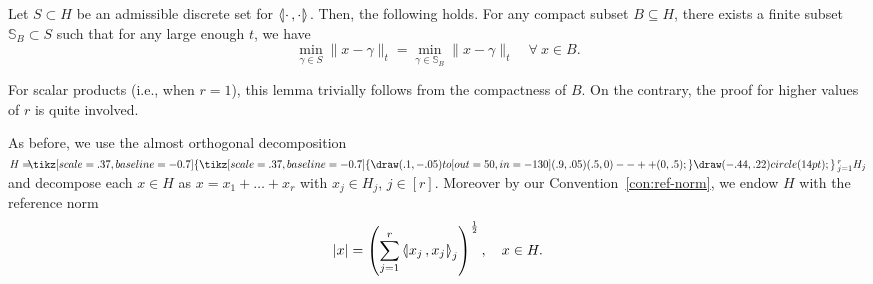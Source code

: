 \documentclass[AHL,Unicode,longabstracts]{cedram}
\newcommand{\symbuptm}{\tikz[scale=.37, baseline=-0.7]{\draw(.1,-.05)to[out=50,in=-130](.9,.05) (.5,0)--++(0,.5);}}
\newcommand{\almorth}{\tikz[scale=.37, baseline=-0.7]{\symbuptm \draw (-.44,.22) circle (14pt);}}
\newcommand{\aplus}{\hspace{-.2cm}\almorth\,}
\newcommand{\llangle}{\mathopen{\langle\mkern -3.1mu\lvert}}
\newcommand{\rrangle}{\mathclose{\rvert\mkern -3.1mu\rangle}}
\newcommand{\highinn}[2]{{\llangle#2\rrangle_{#1}}}
\newcommand{\norm}[1]{\|#1\|}
\newcommand{\refnorm}[1]{\lvert#1\rvert}
\renewcommand{\S}{\mathbb{S}}
\let\oldforall\forall
\renewcommand*{\forall}{\mathrel{\oldforall}}
\begin{document}
\begin{lemm} \label{lem:finiteness-discrete}
Let $S \subset H$ be an admissible discrete set for $\highinn{}{\cdot\,,\cdot}$. Then, the following holds. For any compact subset $B \subseteq H$, there exists a finite subset $\S_B \subset S$ such that for any large enough $t$, we have
\[
\min_{\gamma \in S} \norm{x -\gamma}_t = \min_{\gamma \in \S_B} \norm{x -\gamma}_t \quad \forall \: x \in B.
\]
\end{lemm}
For scalar products (i.e., when $r=1$), this lemma trivially follows from the compactness of $B$. On the contrary, the proof for higher values of $r$ is quite involved.

As before, we use the almost orthogonal decomposition $H = \aplus_{j=1}^r H_j$ and decompose each $x \in H$ as $x = x_1 + \dots +x_r$ with $x_j \in H_j$, $j\in[r]$. Moreover by our Convention~\ref{con:ref-norm}, we endow $H$ with the reference norm
\[
\refnorm{x} = \left(\sum_{j=1}^r \highinn{j}{x_j\,,x_j} \right)^{\frac{1}{2}}, \quad x \in H.
\]
\end{document}
